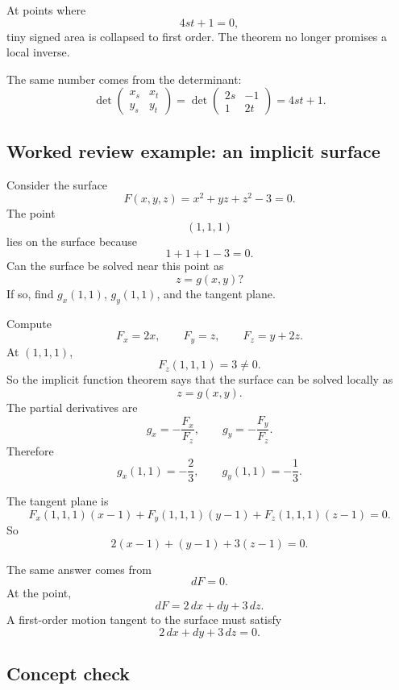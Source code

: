At points where
\[
    4st+1=0,
\]
tiny signed area is collapsed to first order.  The theorem no longer promises a local
inverse.

The same number comes from the determinant:
\[
\det
\begin{pmatrix}
    x_s & x_t\\
    y_s & y_t
\end{pmatrix}
=
\det
\begin{pmatrix}
    2s & -1\\
    1 & 2t
\end{pmatrix}
=
4st+1.
\]

\subsection{Worked review example: an implicit surface}

Consider the surface
\[
    F(x,y,z)=x^2+yz+z^2-3=0.
\]
The point
\[
    (1,1,1)
\]
lies on the surface because
\[
    1+1+1-3=0.
\]
Can the surface be solved near this point as
\[
    z=g(x,y)?
\]
If so, find \(g_x(1,1)\), \(g_y(1,1)\), and the tangent plane.

Compute
\[
    F_x=2x,
    \qquad
    F_y=z,
    \qquad
    F_z=y+2z.
\]
At \((1,1,1)\),
\[
    F_z(1,1,1)=3\ne0.
\]
So the implicit function theorem says that the surface can be solved locally as
\[
    z=g(x,y).
\]
The partial derivatives are
\[
    g_x=-\frac{F_x}{F_z},
    \qquad
    g_y=-\frac{F_y}{F_z}.
\]
Therefore
\[
    g_x(1,1)=-\frac23,
    \qquad
    g_y(1,1)=-\frac13.
\]

The tangent plane is
\[
    F_x(1,1,1)(x-1)
    +
    F_y(1,1,1)(y-1)
    +
    F_z(1,1,1)(z-1)
    =
    0.
\]
So
\[
\boxed{
    2(x-1)+(y-1)+3(z-1)=0.
}
\]

The same answer comes from
\[
    dF=0.
\]
At the point,
\[
    dF=2\,dx+dy+3\,dz.
\]
A first-order motion tangent to the surface must satisfy
\[
    2\,dx+dy+3\,dz=0.
\]

\subsection{Concept check}

